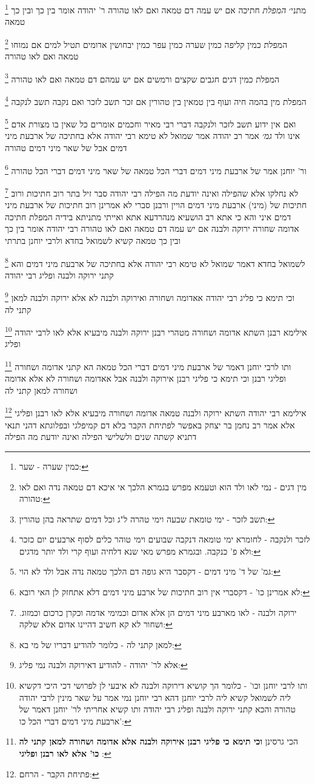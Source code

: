 \documentclass[12pt, openany]{book}
\newcommand{\footnotecomment}[1]{
	\renewcommand\thefootnote{}
	\footnote{#1}}
\newcommand{\commenta}[1]{\footnotecomment{#1}}
\begin{document}
{{\commenta{כמין שערה - שער:}
מתני׳ {\large\emph{המפלת}} חתיכה אם יש עמה דם טמאה ואם לאו טהורה ר' יהודה אומר בין כך ובין כך טמאה 
\commenta{מין דגים - נמי לאו ולד הוא וטעמא מפרש בגמרא הלכך אי איכא דם טמאה נדה ואם לאו טהורה:}
המפלת כמין קליפה כמין שערה כמין עפר כמין יבחושין אדומים תטיל למים אם נמוחו טמאה ואם לאו טהורה 
\commenta{תשב לזכר - ימי טומאת שבעה וימי טהרה ל"ג וכל דמים שתראה בהן טהורין:}
המפלת כמין דגים חגבים שקצים ורמשים אם יש עמהם דם טמאה ואם לאו טהורה 
\commenta{לזכר ולנקבה - לחומרא ימי טומאה דנקבה שבועים וימי טוהר כלים לסוף ארבעים יום כזכר ולא פ' כנקבה. ובגמרא מפרש מאי שנא דלחיה ועוף קרי ולד יותר מדגים:}
המפלת מין בהמה חיה ועוף בין טמאין בין טהורין אם זכר תשב לזכר ואם נקבה תשב לנקבה
\commenta{גמ' של ד' מיני דמים - דקסבר היא גופה דם הלכך טמאה נדה אבל ולד לא הוי:}
ואם אין ידוע תשב לזכר ולנקבה דברי רבי מאיר וחכמים אומרים כל שאין בו מצורת אדם אינו ולד
{\large\emph{גמ׳}} אמר רב יהודה אמר שמואל לא טימא רבי יהודה אלא בחתיכה של ארבעת מיני דמים אבל של שאר מיני דמים טהורה 
\commenta{לא אמרינן כו' - דקסברי אין רוב חתיכות של ארבע מיני דמים דלא אתחזק לן האי רובא:}
ור' יוחנן אמר של ארבעת מיני דמים דברי הכל טמאה של שאר מיני דמים דברי הכל טהורה 
\commenta{ירוקה ולבנה - לאו מארבע מיני דמים הן אלא אדום וכמימי אדמה וכקרן כרכום וכמזוג. ושחור לא קא חשיב דהיינו אדום אלא שלקה:}
לא נחלקו אלא שהפילה ואינה יודעת מה הפילה רבי יהודה סבר זיל בתר רוב חתיכות ורוב חתיכות של (מיני) ארבעת מיני דמים הויין ורבנן סברי לא אמרינן רוב חתיכות של ארבעת מיני דמים 
איני והא כי אתא רב הושעיא מנהרדעא אתא ואייתי מתניתא בידיה המפלת חתיכה אדומה שחורה ירוקה ולבנה אם יש עמה דם טמאה ואם לאו טהורה רבי יהודה אומר בין כך ובין כך טמאה קשיא לשמואל בחדא ולרבי יוחנן בתרתי 
\commenta{למאן קתני לה - כלומר להודיע דבריו של מי בא:}
לשמואל בחדא דאמר שמואל לא טימא רבי יהודה אלא בחתיכה של ארבעת מיני דמים והא קתני ירוקה ולבנה ופליג רבי יהודה 
\commenta{אלא לר' יהודה - להודיע דאירוקה ולבנה נמי פליג:}
וכי תימא כי פליג רבי יהודה אאדומה ושחורה ואירוקה ולבנה לא אלא ירוקה ולבנה למאן קתני לה 
\commenta{ותו לרבי יוחנן וכו' - כלומר הך קושיא דירוקה ולבנה לא איבעי לן לפרושי דכי היכי דקשיא ליה לשמואל קשיא ליה לרבי יוחנן דהא רבי יוחנן נמי אמר על שאר מינין לרבי יהודה טהורה והכא קתני ירוקה ולבנה ופליג רבי יהודה ותו קשיא אחריתי לר' יוחנן דאמר של ארבעת מיני דמים דברי הכל כו':}
אילימא רבנן השתא אדומה ושחורה מטהרי רבנן ירוקה ולבנה מיבעיא אלא לאו לרבי יהודה ופליג 
\commenta{הכי גרסינן \textbf{וכי תימא כי פליגי רבנן אירוקה ולבנה אלא אדומה ושחורה למאן קתני לה כו' אלא לאו רבנן ופליגי} :}
ותו לרבי יוחנן דאמר של ארבעת מיני דמים דברי הכל טמאה הא קתני אדומה ושחורה ופליגי רבנן 
וכי תימא כי פליגי רבנן אירוקה ולבנה אבל אאדומה ושחורה לא אלא אדומה ושחורה למאן קתני לה 
\commenta{פתיחת הקבר - הרחם:}
אילימא רבי יהודה השתא ירוקה ולבנה טמאה אדומה ושחורה מיבעיא אלא לאו רבנן ופליגי 
אלא אמר רב נחמן בר יצחק באפשר לפתיחת הקבר בלא דם קמיפלגי ובפלוגתא דהני תנאי דתניא קשתה שנים ולשלישי הפילה ואינה יודעת מה הפילה}

}
\end{document}
